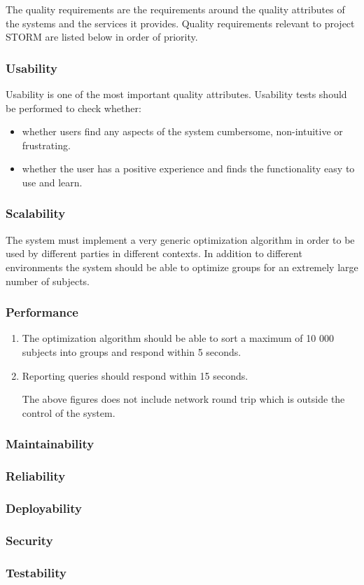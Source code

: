 The quality requirements are the requirements around the quality attributes of the systems and
the services it provides. Quality requirements relevant to project STORM are listed below in order of priority. \par

\subsubsection{Usability}
Usability is one of the most important quality attributes. Usability tests should be performed to check whether:
\begin{itemize}
\item whether users find any aspects of the system cumbersome, non-intuitive or frustrating.
\item whether the user has a positive experience and finds the functionality easy to use and learn.
\end{itemize}
\subsubsection{Scalability}
The system must implement a very generic optimization algorithm in order to be used by different parties in different contexts. In addition to different environments the system should be able to optimize groups for an extremely large number of subjects.

\subsubsection{Performance}
\begin{enumerate}
\item The optimization algorithm should be able to sort a maximum of 10 000 subjects into groups and respond within 5 seconds.
\item Reporting queries should respond within 15 seconds. \par
The above figures does not include network round trip which is outside the control of the system.
\end{enumerate}
\subsubsection{Maintainability} 
\subsubsection{Reliability}
\subsubsection{Deployability}
\subsubsection{Security}
\subsubsection{Testability}

